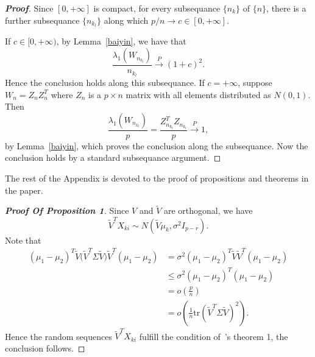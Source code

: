 \documentclass[review]{elsarticle}
\theoremstyle{plain}
\theoremstyle{definition}
\theoremstyle{remark}
\begin{document}
\begin{proof}[\textbf{Proof}]
    Since $[0,+\infty]$ is compact, for every subsequance $\{n_{k}\}$ of $\{n\}$, there is a further subsequance $\{n_{k_l}\}$ along which $p/n\to c\in [0,+\infty]$.

    If $c\in [0,+\infty)$, by Lemma~\ref{baiyin}, we have that
    $$
    \frac{\lambda_1(W_{n_{k_l}})}{n_{k_l}}\xrightarrow{P}{(1+c)}^2.
    $$
    Hence the conclusion holds along this subsequance. If $c=+\infty$, suppose $W_n=Z_n Z_n^T$ where $Z_n$ is a $p\times n$ matrix with all elements distributed as $N(0,1)$. Then
    $$
    \frac{\lambda_1(W_{n_{k_l}})}{p}=\frac{Z_{n_{k_l}}^T Z_{n_{k_l}}}{p}\xrightarrow{P} 1,
    $$
    by Lemma~\ref{baiyin}, which proves the conclusion along the subsequance. Now the conclusion holds by a standard subsequance argument.
\end{proof}



The rest of the Appendix is devoted to the proof of propositions and theorems in the paper.
\begin{proof}[\textbf{Proof Of Proposition 1}]
Since $V$ and $\tilde{V}$ are orthogonal, we have
  $$\tilde{V}^T X_{ki}\sim N(\tilde{V}\mu_k,\sigma^2 I_{p-r}).$$
Note that
    \begin{equation*}
        \begin{aligned}
            {(\mu_1-\mu_2)}^T\tilde{V}\big(\tilde{V}^T\Sigma\tilde{V}\big)\tilde{V}^T(\mu_1-\mu_2)
            &=\sigma^2{(\mu_1-\mu_2)}^T\tilde{V}\tilde{V}^T(\mu_1-\mu_2)\\
            &\leq \sigma^2{(\mu_1-\mu_2)}^T(\mu_1-\mu_2)\\
            &=o(\frac{p}{n})\\
            &=o(\frac{1}{n}\mathrm{tr}{(\tilde{V}^T\Sigma\tilde{V})}^2).
        \end{aligned}
    \end{equation*}
Hence the random sequences $\tilde{V}^T X_{ki}$ fulfill the condition of~\cite{Chen2010A}'s theorem 1, the conclusion follows.
\end{proof}



\end{document}
